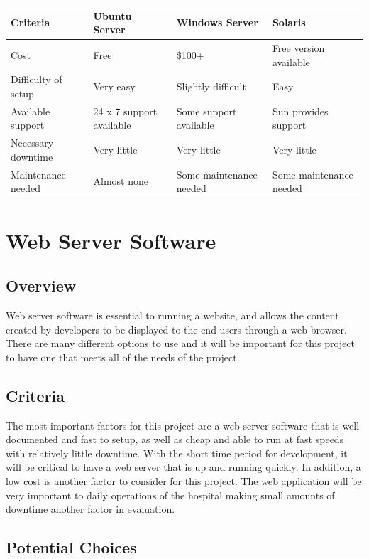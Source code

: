 \documentclass[onecolumn, draftclsnofoot,10pt, compsoc]{IEEEtran}
\begin{document}
\begin{table}[h!]
\centering
\begin{tabular}{ |l|l|l|l| } 
\hline
\textbf{Criteria} & \textbf{Ubuntu Server} & \textbf{Windows Server} & \textbf{Solaris} \\ \hline
Cost & Free & \$100+ & Free version available \\ \hline
Difficulty of setup & Very easy & Slightly difficult & Easy \\ \hline
Available support & 24 x 7 support available & Some support available & Sun provides support \\ \hline
Necessary downtime & Very little & Very little & Very little \\ \hline
Maintenance needed & Almost none & Some maintenance needed & Some maintenance needed \\ \hline
\end{tabular}
\end{table}

\section{Web Server Software}

\subsection{Overview}
Web server software is essential to running a website, and allows the content created by developers to be displayed to the end users through a web browser. There are many different options to use and it will be important for this project to have one that meets all of the needs of the project.
\subsection{Criteria}
The most important factors for this project are a web server software that is well documented and fast to setup, as well as cheap and able to run at fast speeds with relatively little downtime. With the short time period for development, it will be critical to have a web server that is up and running quickly. In addition, a low cost is another factor to consider for this project. The web application will be very important to daily operations of the hospital making small amounts of downtime another factor in evaluation.
\subsection{Potential Choices}
\end{document}
